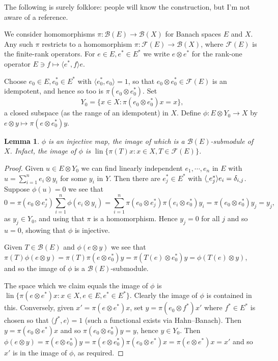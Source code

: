 \documentclass[twoside,a4paper,12pt]{article}
\theoremstyle{plain}
\newtheorem{lemma}[proposition]{Lemma}
\theoremstyle{definition}
\newcommand{\ip}[2]{\langle #1,#2 \rangle}
\newcommand{\mc}{\mathcal}
\newcommand{\lin}{\operatorname{lin}}
\begin{document}
The following is surely folklore: people will know the construction, but I'm not aware of a reference.

We consider homomorphisms $\pi \colon \mc B(E) \to \mc B(X)$ for Banach spaces $E$ and $X$.  Any such $\pi$ restricts to a homomorphism $\pi \colon \mc F(E) \to \mc B(X)$, where $\mc F(E)$ is the finite-rank operators.  For $e\in E, e^*\in E^*$ we write $e\otimes e^*$ for the rank-one operator $E \ni f \mapsto \ip{e^*}{f} e$.

Choose $e_0\in E, e_0^*\in E^*$ with $\ip{e_0^*}{e_0} = 1$, so that $e_0 \otimes e_0^*\in\mc F(E)$ is an idempotent, and hence so too is $\pi(e_0\otimes e_0^*)$.  Set
\[ Y_0 = \{ x\in X : \pi(e_0\otimes e_0^*)x = x \}, \]
a closed subspace (as the range of an idempotent) in $X$.  Define $\phi \colon E\otimes Y_0 \to X$ by $e\otimes y \mapsto \pi(e\otimes e_0^*)y$.

\begin{lemma}
$\phi$ is an injective map, the image of which is a $\mc B(E)$-submodule of $X$.  Infact, the image of $\phi$ is $\lin \{ \pi(T)x : x\in X, T\in\mc F(E) \}$.
\end{lemma}
\begin{proof}
Given $u\in E\otimes Y_0$ we can find linearly independent $e_1,\cdots,e_n$ in $E$ with $u = \sum_{i=1}^n e_i \otimes y_i$ for some $y_i$ in $Y$.  Then there are $e_j^*\in E^*$ with $\ip_{e_j^*}{e_i} = \delta_{i,j}$.  Suppose $\phi(u)=0$ we see that
\[ 0 = \pi(e_0 \otimes e_j^*) \sum_{i=1}^n \phi(e_i \otimes y_i)
= \sum_{i=1}^n \pi(e_0 \otimes e_j^*) \pi(e_i \otimes e_0^*) y_i
= \pi(e_0 \otimes e_0^*) y_j = y_j, \]
as $y_j \in Y_0$, and using that $\pi$ is a homomorphism.  Hence $y_j=0$ for all $j$ and so $u=0$, showing that $\phi$ is injective.

Given $T\in\mc B(E)$ and $\phi(e\otimes y)$ we see that $\pi(T) \phi(e\otimes y) = \pi(T) \pi(e \otimes e_0^*) y = \pi(T(e)\otimes e_0^*) y = \phi(T(e)\otimes y)$, and so the image of $\phi$ is a $\mc B(E)$-submodule.

The space which we claim equals the image of $\phi$ is $\lin\{ \pi(e\otimes e^*)x : x\in X, e\in E, e^*\in E^* \}$.  Clearly the image of $\phi$ is contained in this.  Conversely, given $x' = \pi(e\otimes e^*)x$, set $y = \pi(e_0 \otimes f^*)x'$ where $f^*\in E^*$ is chosen so that $\ip{f^*}{e}=1$ (such a functional exists via Hahn--Banach).  Then $y = \pi(e_0 \otimes e^*)x$ and so $\pi(e_0\otimes e_0^*)y = y$, hence $y\in Y_0$.  Then $\phi(e\otimes y)= \pi(e\otimes e_0^*)y = \pi(e\otimes e_0^*) \pi(e_0 \otimes e^*)x = \pi(e\otimes e^*)x = x'$ and so $x'$ is in the image of $\phi$, as required.
\end{proof}
\end{document}
